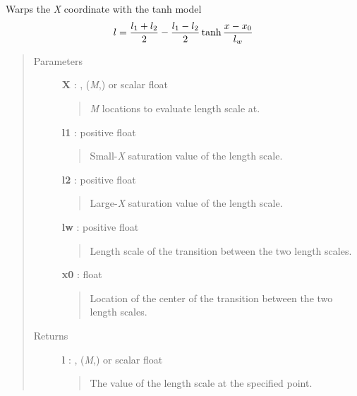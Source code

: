 \documentclass[letterpaper,10pt,english]{sphinxmanual}
\begin{document}
\begin{fulllineitems}
\label{gptools.kernel:gptools.kernel.gibbs.tanh_warp_arb}
Warps the \emph{X} coordinate with the tanh model
\begin{gather}
\begin{split}l = \frac{l_1 + l_2}{2} - \frac{l_1 - l_2}{2}\tanh\frac{x-x_0}{l_w}\end{split}\notag
\end{gather}\begin{quote}\begin{description}
\item[{Parameters}] \leavevmode
\textbf{X} : , (\emph{M},) or scalar float
\begin{quote}

\emph{M} locations to evaluate length scale at.
\end{quote}

\textbf{l1} : positive float
\begin{quote}

Small-\emph{X} saturation value of the length scale.
\end{quote}

\textbf{l2} : positive float
\begin{quote}

Large-\emph{X} saturation value of the length scale.
\end{quote}

\textbf{lw} : positive float
\begin{quote}

Length scale of the transition between the two length scales.
\end{quote}

\textbf{x0} : float
\begin{quote}

Location of the center of the transition between the two length scales.
\end{quote}

\item[{Returns}] \leavevmode
\textbf{l} : , (\emph{M},) or scalar float
\begin{quote}

The value of the length scale at the specified point.
\end{quote}

\end{description}\end{quote}

\end{fulllineitems}
\end{document}
